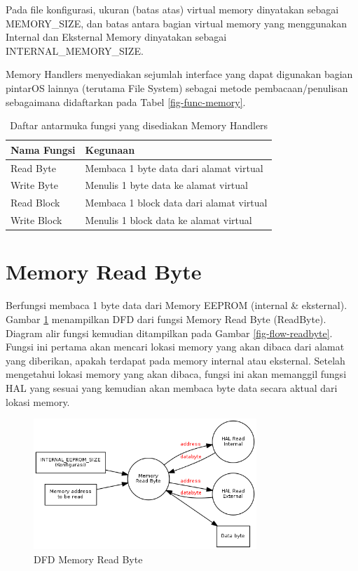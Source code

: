 Pada file konfigurasi, ukuran (batas atas) virtual memory dinyatakan sebagai MEMORY\_SIZE, dan batas antara bagian virtual memory yang menggunakan Internal dan Eksternal Memory dinyatakan sebagai INTERNAL\_MEMORY\_SIZE.

Memory Handlers menyediakan sejumlah interface yang dapat digunakan bagian pintarOS lainnya (terutama File System) sebagai metode pembacaan/penulisan sebagaimana didaftarkan pada Tabel \ref{fig-func-memory}.

\begin{table}[h]
  \centering
  \begin{tabular}{|m{5cm}|m{8cm}|}
    \hline
    \bf{Nama Fungsi} & \bf{Kegunaan} \\
    \hline
    Read Byte & Membaca 1 byte data dari alamat virtual \\
    \hline
    Write Byte & Menulis 1 byte data ke alamat virtual \\
    \hline
    Read Block & Membaca 1 block data dari alamat virtual \\
    \hline
    Write Block & Menulis 1 block data ke alamat virtual \\
    \hline
  \end{tabular}
  \caption{Daftar antarmuka fungsi yang disediakan Memory Handlers}
  \label{tabel-func-memory}
\end{table}

\section{Memory Read Byte}
\label{sec_memoryreadbyte}

Berfungsi membaca 1 byte data dari Memory EEPROM (internal & eksternal). Gambar \ref{fig-dfd-readbyte} menampilkan DFD dari fungsi Memory Read Byte (ReadByte). Diagram alir fungsi kemudian ditampilkan pada Gambar \ref{fig-flow-readbyte}. Fungsi ini pertama akan mencari lokasi memory yang akan dibaca dari alamat yang diberikan, apakah terdapat pada memory internal atau eksternal. Setelah mengetahui lokasi memory yang akan dibaca, fungsi ini akan memanggil fungsi HAL yang sesuai yang kemudian akan membaca byte data secara aktual dari lokasi memory.

\begin{figure}[!h]
\centering
\includegraphics[width=0.75\textwidth]{image/memory/dfd_readbyte.png}
\caption{DFD Memory Read Byte}
\label{fig-dfd-readbyte}
\end{figure}

